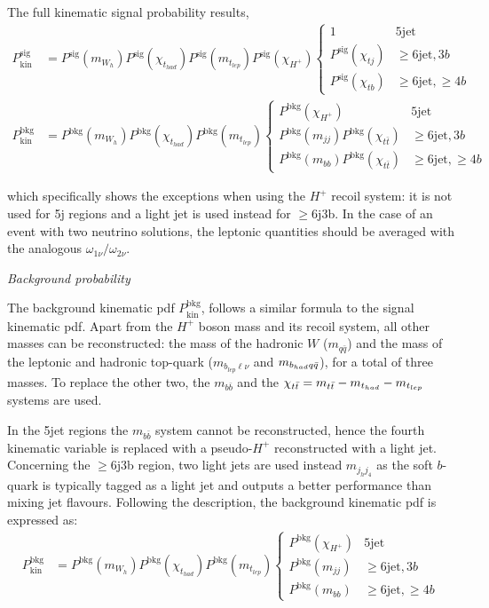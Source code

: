 The full kinematic signal probability results,
\begin{align}
    P_{\text{kin}}^{\text{sig}}&=P^{\text{sig}}(m_{W_h})P^{\text{sig}}(\chi_{t_{had}})P^{\text{sig}}(m_{t_{lep}})P^{\text{sig}}(\chi_{H^+})\begin{cases}1 & 5\text{jet} \\ P^{\text{sig}}(\chi_{tj})&\geq6\text{jet},3b\\P^{\text{sig}}(\chi_{tb})& \geq6\text{jet},\geq4b\end{cases}\\
     P_{\text{kin}}^{\text{bkg}}&=P^{\text{bkg}}(m_{W_h})P^{\text{bkg}}(\chi_{t_{had}})P^{\text{bkg}}(m_{t_{lep}})\begin{cases}P^{\text{bkg}}(\chi_{H^+}) & 5\text{jet} \\ P^{\text{bkg}}(m_{jj})P^{\text{bkg}}(\chi_{t\bar{t}})&\geq6\text{jet},3b\\P^{\text{bkg}}(m_{bb})P^{\text{bkg}}(\chi_{t\bar{t}})& \geq6\text{jet},\geq4b\end{cases}
\end{align}

which specifically shows the exceptions when using the $H^+$ recoil system: it is not used for 5j regions and a light jet is used instead for $\geq$6j3b.
In the case of an event with two neutrino solutions, the leptonic quantities should be averaged with the analogous $\omega_{1\nu}/\omega_{2\nu}$.


\textit{Background probability}

The background kinematic pdf $P_{\text{kin}}^{\text{bkg}}$, follows a similar formula to the signal kinematic pdf. Apart from the $H^+$ boson mass and its recoil system, all other masses can be reconstructed: the mass of the hadronic $W$ ($m_{q\bar{q}}$) and the mass of the leptonic and hadronic top-quark ($m_{b_{lep}\ell\nu}$ and $m_{b_{had}q\Bar{q}}$), for a total of three masses. To replace the other two, the $m_{b\bar{b}}$ and the $\chi_{t\bar{t}}=m_{t\bar{t}}-m_{t_{had}}-m_{t_{lep}}$ systems are used.

In the 5jet regions the $m_{b\bar{b}}$ system cannot be reconstructed, hence the fourth kinematic variable is replaced with a pseudo-$H^+$ reconstructed with a light jet. Concerning the $\geq$6j3b region, two light jets are used instead $m_{j_hj_4}$ as the soft $b$-quark is typically tagged as a light jet and outputs a better performance than mixing jet flavours. Following the description, the background kinematic pdf is expressed as:
\begin{align}
    P_{\text{kin}}^{\text{bkg}}&=P^{\text{bkg}}(m_{W_h})P^{\text{bkg}}(\chi_{t_{had}})P^{\text{bkg}}(m_{t_{lep}})\begin{cases}P^{\text{bkg}}(\chi_{H^+}) & 5\text{jet} \\ P^{\text{bkg}}(m_{jj})&\geq6\text{jet},3b\\P^{\text{bkg}}(m_{bb})& \geq6\text{jet},\geq4b\end{cases}
\end{align}

